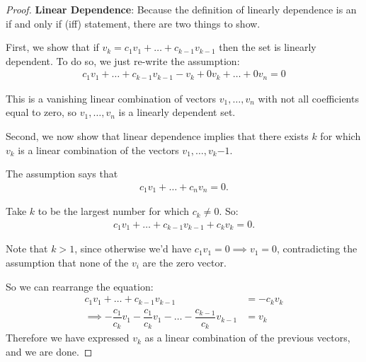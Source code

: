 \documentclass[12pt]{article}
\begin{document}
\begin{proof}
\textbf{Linear Dependence}: Because the definition of linearly dependence is an if and only if (iff) statement, there are two things to show.

\bigskip
\noindent
First, we show that if \(v_k = c_1 v_1 + \dots + c_{k-1} v_{k-1}\) then the set is linearly dependent. To do so, we just re-write the assumption:
\begin{equation}
\begin{split}
c_1 v_1 + \dots + c_{k-1} v_{k-1}-v_k+0v_k+\dots+0v_n=0
\end{split}
\end{equation}

\noindent
This is a vanishing linear combination of vectors \({v_1, \dots,v_n}\) with not all coefficients equal to zero, so \({v_1, \dots,v_n}\) is a linearly dependent set.

\bigskip
\noindent
Second, we now show that linear dependence implies that there exists $k$ for which $v_k$ is a linear combination of the vectors \({v_1, \dots,v_k{-1}}\).

\bigskip
\noindent
The assumption says that 
\begin{equation}
\begin{split}
c_1 v_1 + \dots + c_n v_n=0.
\end{split}
\end{equation}

\bigskip
\noindent
Take $k$ to be the largest number for which \(c_k \neq 0\). So:
\begin{equation}
\begin{split}
c_1 v_1 + \dots + c_{k-1} v_{k-1}+c_k v_k=0.
\end{split}
\end{equation}

\bigskip
\noindent
Note that $k > 1$, since otherwise we'd have \(c_1 v_1 = 0 \implies v_1 = 0\), contradicting the assumption that none of the $v_i$ are the zero vector.

\bigskip
\noindent
So we can rearrange the equation:
\begin{equation}
\begin{split}
c_1 v_1 + \dots + c_{k-1} v_{k-1} &= -c_k v_k \\
\implies -\dfrac{c_1}{c_k}v_1-\dfrac{c_1}{c_k}v_1-\dots-\dfrac{c_{k-1}}{c_k} v_{k-1} &= v_k
\end{split}
\end{equation}
\bigskip
\noindent
Therefore we have expressed $v_k$ as a linear combination of the previous vectors, and we are done.
\end{proof}
\end{document}
